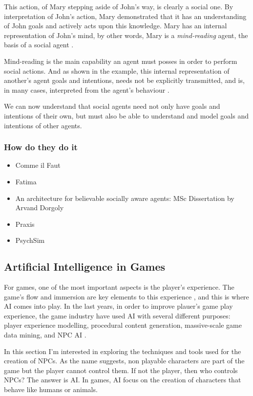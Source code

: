 This action, of Mary stepping aside of John's way, is clearly a social one.
By interpretation of John's action, Mary demonstrated that it has an understanding of John goals and actively acts upon this knowledge.
Mary has an internal representation of John's mind, by other words, Mary is a \textit{mind-reading} agent, the basis of a social agent \cite{castelfranchi:socialactions}.

Mind-reading is the main capability an agent must posses in order to perform social actions.
And as shown in the example, this internal representation of another's agent goals and intentions, needs not be explicitly transmitted, and is, in many cases, interpreted from the agent's behaviour \cite{castelfranchi:socialactions}.

We can now understand that social agents need not only have goals and intentions of their own, but must also be able to understand and model goals and intentions of other agents.

\subsubsection{How do they do it}
\begin{itemize}
\item Comme il Faut
\item Fatima
\item An architecture for believable socially aware agents: MSc Dissertation by Arvand Dorgoly
\item Praxis
\item PsychSim
\end{itemize}
\subsection{Artificial Intelligence in Games}

For games, one of the most important aspects is the player's experience.
The game's flow and immersion are key elements to this experience \cite{ijsselsteijn:userexperience}, and this is where \ac{AI} comes into play.
In the last years, in order to improve plauer's game play experience, the game industry have used \ac{AI} with several different purposes: player experience modelling, procedural content generation, massive-scale game data mining, and \ac{NPC} \ac{AI} \cite{yannakakis:gameairevisited}.

In this section I'm interested in exploring the techniques and tools used for the creation of \ac{NPC}s.
As the name suggests, non playable characters are part of the game but the player cannot control them.
If not the player, then who controls \ac{NPC}s?
The answer is \ac{AI}.
In games, \ac{AI} focus on the creation of characters that behave like humans or animals.

